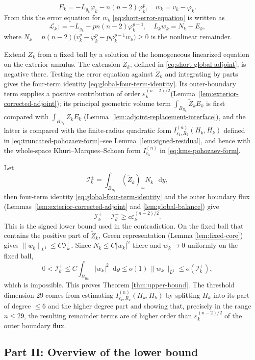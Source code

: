 \documentclass[11pt]{article}
\numberwithin{equation}{section}
\theoremstyle{remark}
\newcommand{\dd}{\mathop{}\!\mathrm{d}}
\begin{document}
\[
 E_k=-L_{g_k}\varphi_k-n(n-2)\varphi_k^p,\quad w_k=v_k-\varphi_k.
\]
From this the error equation for $w_k$ \eqref{eq:short-error-equation} is written as
\[
 \mathcal L_k: =-L_{g_k}-pn(n-2)\varphi_k^{p-1}, \quad L_kw_k=N_k-E_k,
 \]
 where \(N_k=n(n-2)\bigl(v_k^p-\varphi_k^p
        -p\varphi_k^{p-1}w_k\bigr)\ge0\)  is the nonlinear remainder.
        
 Extend
\(Z_k\) from a fixed ball by a solution of the homogeneous linearized
equation on the exterior annulus. The extension \(\widetilde Z_k\), defined in \eqref{eq:short-global-adjoint}, is
negative there. Testing the error equation against \(\widetilde Z_k\) and integrating by parts gives the four-term identity
\eqref{eq:global-four-term-identity}. Its outer-boundary term supplies a positive contribution of order
\(\varepsilon_k^{(n-2)/2}\)(Lemma~\ref{lem:exterior-corrected-adjoint}); its principal geometric volume term \(\int_{B_{R_k}} \widetilde Z_kE_k\)
  is first compared with
\(\int_{B_{R_k}} Z_kE_k\) (Lemma~\ref{lem:adjoint-replacement-interface}), and the latter is compared with the finite-radius quadratic form
\(I_{\varepsilon_k,R_k}^{(n)}(H_k,H_k)\) defined in
\eqref{eq:truncated-pohozaev-form}--see Lemma~\ref{lem:signed-residual}, and hence with the whole-space Khuri--Marques--Schoen form
\(I_{\varepsilon_k}^{(n)}\) in
\eqref{eq:kms-pohozaev-form}.

Let
\[
 \mathcal I_k^\pm
 =\int_{B_{R_k}}(\widetilde Z_k)_\pm N_k\,\dd y,
\]
then four-term identity
\eqref{eq:global-four-term-identity} and the outer boundary flux (Lemmas~\ref{lem:exterior-corrected-adjoint} and  \ref{lem:global-balance}) give
\[
 \mathcal I_k^+-\mathcal I_k^-
 \ge c\varepsilon_k^{(n-2)/2}.
\]
This is the signed lower bound used in the contradiction. On the fixed ball
that contains the positive part of \(\widetilde Z_k\), Green
representation (Lemma  \ref{lem:fixed-core}) gives \(\|w_k\|_{L^1}\le C\mathcal I_k^+\). Since
\(N_k\le C|w_k|^2\) there and \(w_k\to0\) uniformly on the fixed ball,
\[
 0<\mathcal I_k^+\le C\int_{B_{R_0}}|w_k|^2\dd y
 \le o(1)\,\|w_k\|_{L^1}
 \le o(\mathcal I_k^+),
\]
which is impossible. This proves Theorem  \ref{thm:upper-bound}. The threshold dimension $29$ comes from estimating \(I_{\varepsilon_k,R_k}^{(n)}(H_k,H_k)\)
by splitting \(H_k\) into its part of degree $\le 6$ and the higher degree part and showing that, precisely in the range $n\le 29$, the resulting remainder terms are of higher order than  \(\varepsilon_k^{(n-2)/2}\) of the outer boundary flux.

\subsection*{Part II: Overview of the lower bound}
\end{document}
